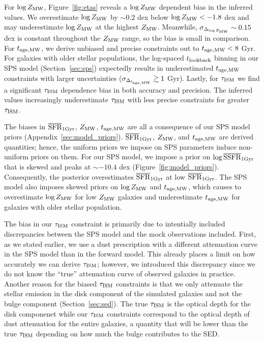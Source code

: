 For $\log Z_{\rm MW}$, Figure~\ref{fig:etas} reveals a $\log Z_{\rm MW}$
dependent bias in the inferred values. 
We overestimate $\log Z_{\rm MW}$ by $\sim 0.2$ dex below $\log Z_{\rm MW} <
-1.8$ dex and may underestimate $\log Z_{\rm MW}$ at the highest $Z_{\rm MW}$.
Meanwhile, $\sigma_{\Delta_{\log Z_{\rm MW}}} \sim 0.15$ dex is constant
throughout the $Z_{\rm MW}$ range, so the bias is small in comparison.
For $t_{\rm age, MW}$, we derive unbiased and precise constraints out to $t_{\rm age, MW} < 8$ Gyr. 
For galaxies with older stellar populations, the log-spaced $t_{\rm lookback}$ binning in
our SPS model (Section~\ref{sec:sps}) expectedly results in underestimated  
$t_{\rm age, MW}$ constraints with larger uncertainties 
($\sigma_{\Delta_{t_{\rm age, MW}}} \gtrsim 1$ Gyr). 
Lastly, for $\tau_{\rm ISM}$ we find a significant $\tau_{\rm ISM}$ dependence bias in both
accuracy and precision. 
The inferred values increasingly underestimate $\tau_{\rm ISM}$ with less precise
constraints for greater $\tau_{\rm ISM}$.

The biases in $\overline{\rm SFR}_{\rm 1Gyr}$, $Z_{\rm MW}$, $t_{\rm age, MW}$ are all a consequence of our SPS
model priors (Appendix~\ref{sec:model_priors}). 
$\overline{\rm SFR}_{\rm 1Gyr}$, $Z_{\rm MW}$, and $t_{\rm age, MW}$ are derived quantities; hence, the uniform
priors we impose on SPS parameters induce non-uniform priors on them.
For our SPS model, we impose a prior on $\log \overline{\rm SSFR}_{\rm 1 Gyr}$
that is skewed and peaks at ${\sim}-10.4$ dex (Figure~\ref{fig:model_priors}). 
Consequently, the posterior overestimates $\overline{\rm SFR}_{\rm 1Gyr}$ at low $\overline{\rm SFR}_{\rm 1Gyr}$.
The SPS model also imposes skewed priors on $\log Z_{\rm MW}$ and $t_{\rm age, MW}$,
which causes to overestimate $\log Z_{\rm MW}$ for low $Z_{\rm MW}$ galaxies
and underestimate $t_{\rm age, MW}$ for galaxies with older stellar population. 

The bias in our $\tau_{\rm ISM}$ constraint is primarily due to intentially included
discrepancies between the SPS model and the mock observations included. 
First, as we stated earlier, we use a dust prescription with a different
attenuation curve in the SPS model than in the forward model. 
This already places a limit on how accurately we can derive $\tau_{\rm ISM}$; however,
we introduced this discrepancy since we do not know the ``true'' attenuation
curve of observed galaxies in practice. 
Another reason for the biased $\tau_{\rm ISM}$ constraints is that we only attenuate
the stellar emission in the disk component of the simulated galaxies and not
the bulge component (Section~\ref{sec:sed}).
The true $\tau_{\rm ISM}$ is the optical depth for the disk componenet while our
$\tau_{\rm ISM}$ constraints correspond to the optical depth of dust attenuation
for the entire galaxies, a quantity that will be lower than the true $\tau_{\rm ISM}$
depending on how much the bulge contributes to the SED. 

